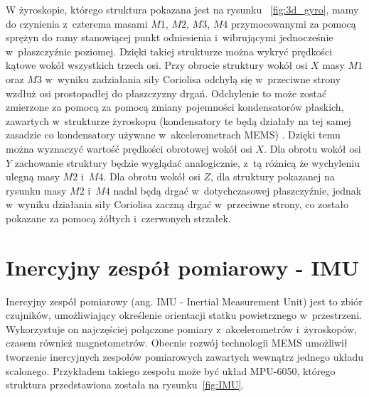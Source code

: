 W żyroskopie, którego struktura pokazana jest na rysunku ~\ref{fig:3d_gyro}, mamy do czynienia z~czterema masami $M1$, $M2$, $M3$, $M4$ przymocowanymi za pomocą sprężyn do ramy stanowiącej punkt odniesienia i~wibrującymi jednocześnie w~płaszczyźnie poziomej. Dzięki takiej strukturze można wykryć prędkości kątowe wokół wszystkich trzech osi. Przy obrocie struktury wokół osi $X$ masy $M1$ oraz $M3$ w~wyniku zadziałania siły Coriolisa odchylą się w~przeciwne strony wzdłuż osi prostopadłej do płaszczyzny drgań. Odchylenie to może zostać zmierzone za pomocą za pomocą zmiany pojemności kondensatorów płaskich, zawartych w~strukturze żyroskopu (kondensatory te będą działały na tej samej zasadzie co kondensatory używane w~akcelerometrach MEMS) . Dzięki temu można wyznaczyć wartość prędkości obrotowej wokół osi $X$. Dla obrotu wokół osi $Y$ zachowanie struktury będzie wyglądać analogicznie, z~tą różnicą że wychyleniu ulegną masy $M2$ i~$M4$. Dla obrotu wokół osi $Z$, dla struktury pokazanej na rysunku masy $M2$ i~$M4$ nadal będą drgać w~dotychczasowej płaszczyźnie, jednak w~wyniku działania siły Coriolisa zaczną drgać w~przeciwne strony, co zostało pokazane za pomocą żółtych i~czerwonych strzałek.



\section{Inercyjny zespół pomiarowy - IMU}

Inercyjny zespół pomiarowy (ang. IMU - Inertial Measurement Unit) jest to zbiór czujników, umożliwiający określenie orientacji statku powietrznego w~przestrzeni. Wykorzystuje on najczęściej połączone pomiary z~akcelerometrów i~żyroskopów, czasem również magnetometrów. Obecnie rozwój technologii MEMS umożliwił tworzenie inercyjnych zespołów pomiarowych zawartych wewnątrz jednego układu scalonego. Przykładem takiego zespołu może być układ MPU-6050, którego struktura przedstawiona została na rysunku~\ref{fig:IMU}.

